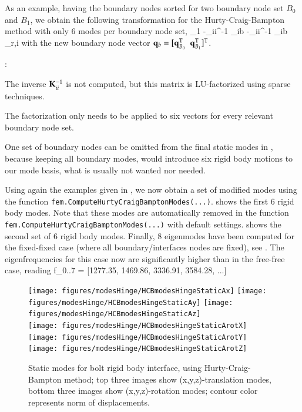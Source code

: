 As an example, having the boundary nodes sorted for two boundary node set $B_0$ and $B_1$, we obtain the following transformation for the Hurty-Craig-Bampton method with only 6 modes per boundary node set,
\be \label{theory:eigenmodes:HCBRBE2}
   \approx {} {\Null}{\Tm_1}{\Null} 
                            {-\Km_{ii}^{-1} \Km_{ib} }{-\Km_{ii}^{-1} \Km_{ib} }{\tPsi_{r,i}}   
   \eqDot
\ee
with the new boundary node vector $\mathbf{q}_b = [\mathbf{q}_{B_0}^\mathrm{T} \;\; \mathbf{q}_{B_1}^\mathrm{T}]^\mathrm{T}$.

\noindent {}:
\bi
  \item The inverse $\mathbf{K}_{ii}^{-1} $ is not computed, but this matrix is LU-factorized using sparse techniques.
  \item The factorization only needs to be applied to six vectors for every relevant boundary node set.
  \item One set of boundary nodes can be omitted from the final static modes in , because keeping all boundary modes, would introduce six rigid body motions to our mode basis, what is usually not wanted nor needed.
\ei

Using again the examples given in , we now obtain a set of modified modes using the function \texttt{fem.ComputeHurtyCraigBamptonModes(...)}.
 shows the first 6 rigid body modes. Note that these modes are automatically removed in the function \texttt{fem.ComputeHurtyCraigBamptonModes(...)} with default settings.
 shows the second set of 6 rigid body modes. 
Finally, 8 eigenmodes have been computed for the fixed-fixed case (where all boundary/interfaces nodes are fixed),
see . 
The eigenfrequencies for this case now are significantly higher than in the free-free case, reading
\be
  f_{0..7} = [1277.35, 1469.86, 3336.91, 3584.28, ...]
\ee
\begin{figure}[tbph]
  \begin{center}
  \texttt{[image: figures/modesHinge/HCBmodesHingeStaticAx]}
  \texttt{[image: figures/modesHinge/HCBmodesHingeStaticAy]}
  \texttt{[image: figures/modesHinge/HCBmodesHingeStaticAz]}\\
  \texttt{[image: figures/modesHinge/HCBmodesHingeStaticArotX]}
  \texttt{[image: figures/modesHinge/HCBmodesHingeStaticArotY]}
  \texttt{[image: figures/modesHinge/HCBmodesHingeStaticArotZ]}
  \end{center}
  \caption{Static modes for bolt rigid body interface, using Hurty-Craig-Bampton method; top three images show (x,y,z)-translation modes, bottom three images show (x,y,z)-rotation modes; contour color represents norm of displacements.}
  \label{fig_hingePartStaticModesA}
\end{figure}

